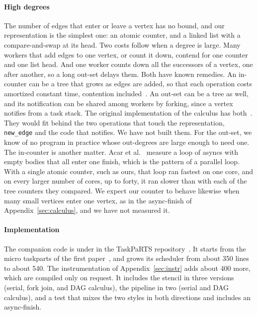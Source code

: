 \documentclass[sigplan,nonacm]{acmart}
\begin{document}
\paragraph{High degrees}
%
The number of edges that enter or leave a vertex has no bound, and our
representation is the simplest one: an atomic counter, and a linked
list with a compare-and-swap at its head.
%
Two costs follow when a degree is large.
%
Many workers that add edges to one vertex, or count it down, contend
for one counter and one list head.
%
And one worker counts down all the successors of a vertex, one after
another, so a long out-set delays them.
%
Both have known remedies.
%
An in-counter can be a tree that grows as edges are added, so that
each operation costs amortized constant time, contention
included~\cite{acar2017dynsnzi}.
%
An out-set can be a tree as well, and its notification can be shared
among workers by forking, since a vertex notifies from a task stack.
%
The original implementation of the calculus has
both~\cite{Dag_calculus_16}.
%
They would fit behind the two operations that touch the
representation, \lstinline|new_edge| and the code that notifies.
%
We have not built them.
%
For the out-set, we know of no program in practice whose out-degrees
are large enough to need one.
%
The in-counter is another matter.
%
Acar et al.~\cite{acar2017dynsnzi} measure a loop of asyncs with empty
bodies that all enter one finish, which is the pattern of a parallel
loop.
%
With a single atomic counter, such as ours, that loop ran fastest on
one core, and on every larger number of cores, up to forty, it ran
slower than with each of the tree counters they compared.
%
We expect our counter to behave likewise when many small vertices
enter one vertex, as in the async-finish of
Appendix~\ref{sec:calculus}, and we have not measured it.

\paragraph{Implementation}
%
The companion code is under  in the TaskPaRTS
repository~\cite{taskparts}.
%
It starts from the micro taskparts of the first
paper~\cite{nativeforkjoin}, and grows its scheduler from about 350
lines to about 540.
%
The instrumentation of Appendix~\ref{sec:instr} adds about 400 more,
which are compiled only on request.
%
It includes the stencil in three versions (serial, fork join, and DAG
calculus), the pipeline in two (serial and DAG calculus), and a test
that mixes the two styles in both directions and includes an
async-finish.
\end{document}
